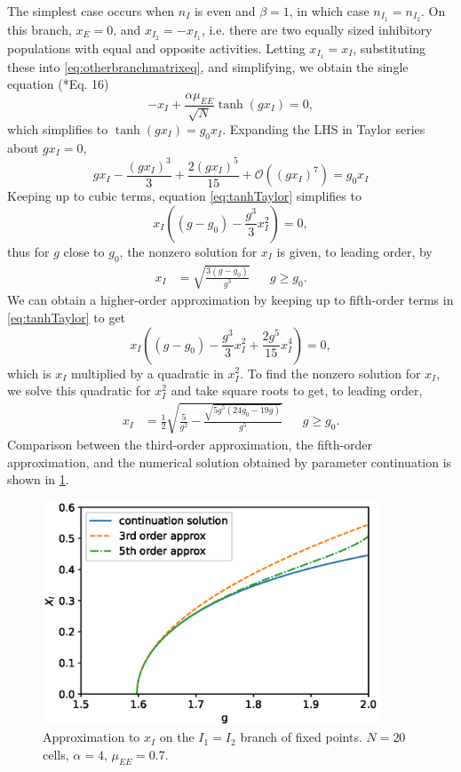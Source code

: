 \documentclass[11pt,reqno]{amsart}
\begin{document}
The simplest case occurs when $n_I$ is even and $\beta = 1$, in which case $n_{I_1}=n_{I_2}$. On this branch, $x_E = 0$, and $x_{I_2} = -x_{I_1}$, i.e. there are two equally sized inhibitory populations with equal and opposite activities. Letting $x_{I_1} = x_I$, substituting these into \cref{eq:otherbranchmatrixeq}, and simplifying, we obtain the single equation (\cite{Barreiro2017}*{Eq. 16})
\[
-x_I + \frac{\alpha \mu_{EE} }{\sqrt{N}} \tanh(g x_I) = 0, 
\]
which simplifies to $\tanh(g x_I) = g_0 x_I$. Expanding the LHS in Taylor series about $g x_I = 0$,
\begin{equation}\label{eq:tanhTaylor}
g x_I - \frac{(g x_I)^3}{3} + \frac{2(g x_I)^5}{15} + \mathcal{O}\left( (g x_I)^7 \right) = g_0 x_I
\end{equation}
Keeping up to cubic terms, equation \cref{eq:tanhTaylor} simplifies to
\[
x_I \left( (g - g_0) - \frac{g^3}{3} x_I^2 \right) = 0,
\]
thus for $g$ close to $g_0$, the nonzero solution for $x_I$ is given, to leading order, by
\begin{align}\label{eq:xIapprox}
x_I &= \sqrt{ \frac{3(g - g_0) }{g^3}} && g \geq g_0.
\end{align}
We can obtain a higher-order approximation by keeping up to fifth-order terms in \cref{eq:tanhTaylor} to get
\begin{equation*}
x_I \left( (g - g_0) - \frac{g^3}{3} x_I^2 + \frac{2 g^5}{15} x_I^4 \right) = 0,
\end{equation*}
which is $x_I$ multiplied by a quadratic in $x_I^2$. To find the nonzero solution for $x_I$, we solve this quadratic for $x_I^2$ and take square roots to get, to leading order,
\begin{align}\label{eq:xIapprox5}
x_I &= \frac{1}{2} \sqrt{ \frac{5}{g^2} - \frac{\sqrt{ 5 g^5( 24 g_0 - 19 g) }}{g^5}} && g \geq g_0.
\end{align}
Comparison between the third-order approximation, the fifth-order approximation, and the numerical solution obtained by parameter continuation is shown in \cref{fig:xIapprox}.

\begin{figure}
    \centering
    \includegraphics[width=10cm]{images/Xiapprox.eps}
    \caption{Approximation to $x_I$ on the $I_1=I_2$ branch of fixed points. $N = 20$ cells, $\alpha = 4$, $\mu_{EE} = 0.7$.}
    \label{fig:xIapprox}
\end{figure}
\end{document}
